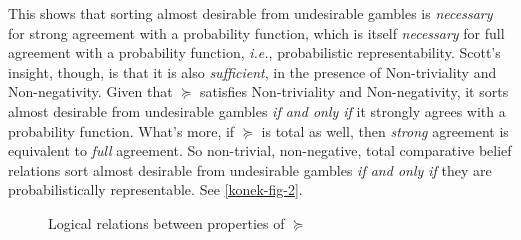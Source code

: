 This shows that sorting almost desirable from undesirable gambles is \textit{necessary} for strong agreement with a probability function, which is itself \textit{necessary} for full agreement with a probability function, \textit{i.e.}, probabilistic representability. Scott's insight, though, is that it is also \textit{sufficient}, in the presence of Non-triviality and Non-negativity. Given that $\succeq$ satisfies Non-triviality and Non-negativity, it sorts almost desirable from undesirable gambles \textit{if and only if} it strongly agrees with a probability function. What's more, if $\succeq$ is total as well, then \textit{strong} agreement is equivalent to \textit{full} agreement. So non-trivial, non-negative, total comparative belief relations sort almost desirable from undesirable gambles \textit{if and only if} they are probabilistically representable. See \autoref{konek-fig-2}.

\begin{figure}
\centering
{}
\caption{Logical relations between properties of $\succeq$}\label{konek-fig-2}
\end{figure}


